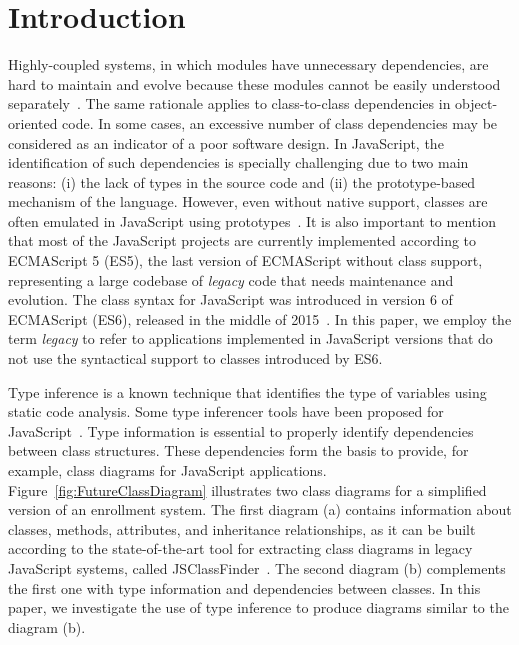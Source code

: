 \documentclass[review]{elsarticle}
\begin{document}
\linenumbers

\section{Introduction}
\label{sec:introduction}


Highly-coupled systems, in which modules have unnecessary dependencies, are hard to maintain and evolve because these modules cannot be easily understood separately~\cite{Parnas1978, dsm}. The same rationale applies to class-to-class dependencies in object-oriented code. In some cases, an excessive number of class dependencies may be considered as an indicator of a poor software design. In JavaScript, the identification of such dependencies is specially challenging due to two main reasons: (i) the lack of types in the source code and (ii) the prototype-based mechanism of the language. However, even without native support, classes are often emulated in JavaScript using prototypes~\cite{silva-saner2015, gama:2012}. It is also important to mention that most of the JavaScript projects are currently implemented according to ECMAScript 5 (ES5), the last version of ECMAScript without class support, representing a large codebase of \textit{legacy} code that needs maintenance and evolution. The class syntax for JavaScript was introduced in version 6 of ECMAScript (ES6), released in the middle of 2015~\cite{ecmascript6}. In this paper, we employ the term \emph{legacy} to refer to applications implemented in JavaScript versions that do not use the syntactical support to classes introduced by ES6.

Type inference is a known technique that identifies the type of variables using static code analysis. Some type inferencer tools have been proposed for JavaScript~\cite{odgaard-2014, Hack12a,Ande05a}. Type information is essential to properly identify dependencies between class structures. These dependencies form the basis to provide, for example, class diagrams for JavaScript applications. Figure~\ref{fig:FutureClassDiagram} illustrates two class diagrams for a simplified version of an enrollment system. The first diagram (a) contains information about classes, methods, attributes, and inheritance relationships, as it can be built according to the state-of-the-art tool for extracting class diagrams in legacy JavaScript systems, called {\sc JSClassFinder}~\cite{silva-cbsoft2015}. The second diagram (b) complements the first one with type information and dependencies between classes. In this paper, we investigate the use of type inference to produce diagrams similar to the diagram (b).
\end{document}
